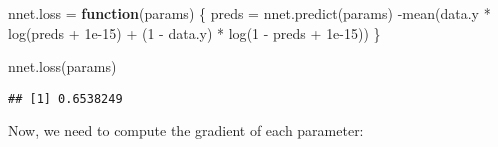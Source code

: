\documentclass[
  a4paper,
]{article}
\newenvironment{Shaded}{\begin{snugshade}}{\end{snugshade}}
\newcommand{\ControlFlowTok}[1]{\textcolor[rgb]{0.13,0.29,0.53}{\textbf{#1}}}
\newcommand{\DecValTok}[1]{\textcolor[rgb]{0.00,0.00,0.81}{#1}}
\newcommand{\FloatTok}[1]{\textcolor[rgb]{0.00,0.00,0.81}{#1}}
\newcommand{\FunctionTok}[1]{\textcolor[rgb]{0.00,0.00,0.00}{#1}}
\newcommand{\NormalTok}[1]{#1}
\newcommand{\OtherTok}[1]{\textcolor[rgb]{0.56,0.35,0.01}{#1}}
\newcommand{\SpecialCharTok}[1]{\textcolor[rgb]{0.00,0.00,0.00}{#1}}
\begin{document}
\begin{Shaded}
\begin{Highlighting}[]
\NormalTok{nnet.loss }\OtherTok{=} \ControlFlowTok{function}\NormalTok{(params) \{}
\NormalTok{  preds }\OtherTok{=} \FunctionTok{nnet.predict}\NormalTok{(params)}
  \SpecialCharTok{{-}}\FunctionTok{mean}\NormalTok{(data.y }\SpecialCharTok{*} \FunctionTok{log}\NormalTok{(preds }\SpecialCharTok{+} \FloatTok{1e{-}15}\NormalTok{) }\SpecialCharTok{+}\NormalTok{ (}\DecValTok{1} \SpecialCharTok{{-}}\NormalTok{ data.y) }\SpecialCharTok{*} \FunctionTok{log}\NormalTok{(}\DecValTok{1} \SpecialCharTok{{-}}\NormalTok{ preds }\SpecialCharTok{+} \FloatTok{1e{-}15}\NormalTok{))}
\NormalTok{\}}

\FunctionTok{nnet.loss}\NormalTok{(params)}
\end{Highlighting}
\end{Shaded}

\begin{verbatim}
## [1] 0.6538249
\end{verbatim}

Now, we need to compute the gradient of each parameter:
\end{document}
